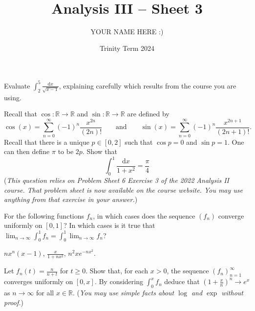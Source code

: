 \documentclass[answers]{exam}
\title{Analysis III -- Sheet 3}
\author{YOUR NAME HERE :)}
\date{Trinity Term 2024}
\begin{document}
\maketitle
\begin{questions}

\question%
Evaluate $\int_{2}^{5} \frac{\mathrm d x}{\sqrt{x-1}}$, explaining carefully which results from the course you are using.



\question%
Recall that $\cos : \mathbb{R} \rightarrow \mathbb{R}$ and $\sin : \mathbb{R} \rightarrow \mathbb{R}$ are defined by \[
	\cos (x)=\sum_{n=0}^{\infty}(-1)^{n} \frac{x^{2 n}}{(2 n) !}
	\qquad\text{and}\qquad
	\sin (x)=\sum_{n=0}^{\infty}(-1)^{n} \frac{x^{2 n+1}}{(2 n+1) !}.
\] Recall that there is a unique $p \in[0,2]$ such that $\cos p=0$ and $\sin p=1$. One can then define $\pi$ to be $2 p$. Show that \[
	\int_{0}^{1} \frac{\mathrm d x}{1+x^{2}}=\frac\pi4
\] (\emph{This question relies on Problem Sheet 6 Exercise 3 of the 2022 Analysis II course. That problem sheet is now available on the course website. You may use anything from that exercise in your answer.})



\question%
For the following functions $f_{n}$, in which cases does the sequence $\left(f_{n}\right)$ converge uniformly on $[0,1]$? In which cases is it true that $\lim _{n \rightarrow \infty} \int_{0}^{1} f_{n}=\int_{0}^{1} \lim _{n \rightarrow \infty} f_{n}$?
\begin{subparts}
\subpart $n x^{n}(x-1)$,
\subpart $\displaystyle\frac{x}{1+n x^{2}}$,
\subpart $n^{2} x e^{-n x^{2}}$.
\end{subparts}



\question%
Let $f_{n}(t)=\frac{n}{n+t}$ for $t \geqslant 0$. Show that, for each $x>0$, the sequence $\left(f_{n}\right)_{n=1}^{\infty}$ converges uniformly on $[0, x]$. By considering $\int_{0}^{x} f_{n}$ deduce that $\left(1+\frac{x}{n}\right)^{n} \rightarrow e^{x}$ as $n \rightarrow \infty$ for all $x \in \mathbb{R}$. (\emph{You may use simple facts about $\log$ and $\exp$ without proof.})

\end{questions}
\end{document}
